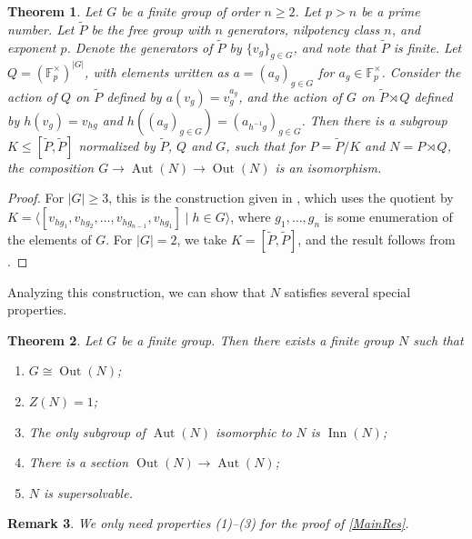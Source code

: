 \documentclass[11pt]{amsart}
\newtheorem{thm}{Theorem}[section]
\newtheorem{rmk}[thm]{Remark}
\numberwithin{equation}{section}
\begin{document}
\begin{thm} \label{thm:explicit-cornulier}
Let $G$ be a finite group of order $n \ge 2$. Let $p > n$ be a prime number. Let $\widetilde P$ be the free group with $n$ generators, nilpotency class $n$, and exponent $p$. Denote the generators of $\widetilde P$ by $\{v_g\}_{g \in G}$, and note that $\widetilde P$ is finite. Let $Q = (\mathbb{F}_p^\times)^{|G|}$, with elements written as $a = (a_g)_{g \in G}$ for $a_g \in \mathbb{F}_p^\times$. Consider the action of $Q$ on $\widetilde P$ defined by $a(v_g) = v_g^{a_g}$, and the action of $G$ on $\widetilde P \rtimes Q$ defined by $h(v_g) = v_{hg}$ and $h\left((a_g)_{g \in G}\right) = (a_{h^{-1}g})_{g \in G}$. Then there is a subgroup $K \le [\widetilde P, \widetilde P]$ normalized by $\widetilde P$, $Q$ and $G$, such that for $P = \widetilde P / K$ and $N = P \rtimes Q$, the composition $G \to \operatorname{Aut}(N) \to \operatorname{Out}(N)$ is an isomorphism.
\end{thm}

\begin{proof}
For $|G| \ge 3$, this is the construction given in \cite[Theorem 8]{group-theoretic-cornulier}, which uses the quotient by $K = \langle[v_{hg_1}, v_{hg_2}, \dots, v_{hg_{n - 1}}, v_{hg_1}] \mid h \in G\rangle$, where $g_1, \ldots, g_n$ is some enumeration of the elements of $G$. For $|G| = 2$, we take $K = [\widetilde{P}, \widetilde{P}]$, and the result follows from \cite[Lemma 5]{group-theoretic-cornulier}. 
\end{proof}

Analyzing this construction, we can show that $N$ satisfies several special properties.

\begin{thm}\label{thm:cornulier-with-properties}
Let $G$ be a finite group. Then there exists a finite group $N$ such that
\begin{enumerate}
\item $G \cong \operatorname{Out}(N)$;
\item $Z(N) = 1$;
\item The only subgroup of $\operatorname{Aut}(N)$ isomorphic to $N$ is $\operatorname{Inn}(N)$;
\item There is a section $\operatorname{Out}(N) \to \operatorname{Aut}(N)$;
\item $N$ is supersolvable.
\end{enumerate}
\end{thm}

\begin{rmk}
We only need properties (1)--(3) for the proof of \cref{MainRes}.
\end{rmk}
\end{document}
